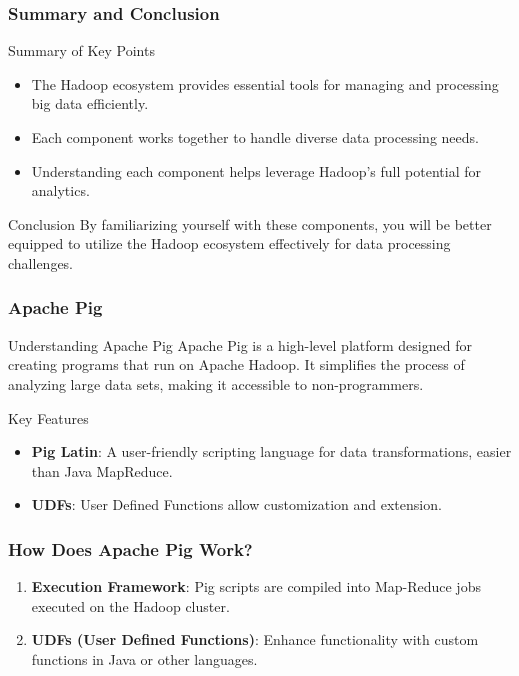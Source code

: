 \documentclass[aspectratio=169]{beamer}
\begin{document}
\begin{frame}[fragile]
    \frametitle{Summary and Conclusion}
    \begin{block}{Summary of Key Points}
        \begin{itemize}
            \item The Hadoop ecosystem provides essential tools for managing and processing big data efficiently.
            \item Each component works together to handle diverse data processing needs.
            \item Understanding each component helps leverage Hadoop’s full potential for analytics.
        \end{itemize}
    \end{block}
    
    \begin{block}{Conclusion}
        By familiarizing yourself with these components, you will be better equipped to utilize the Hadoop ecosystem effectively for data processing challenges. 
    \end{block}
\end{frame}

\begin{frame}
    \frametitle{Apache Pig}
    \begin{block}{Understanding Apache Pig}
        Apache Pig is a high-level platform designed for creating programs that run on Apache Hadoop. It simplifies the process of analyzing large data sets, making it accessible to non-programmers.
    \end{block}
    \begin{block}{Key Features}
        \begin{itemize}
            \item \textbf{Pig Latin}: A user-friendly scripting language for data transformations, easier than Java MapReduce.
            \item \textbf{UDFs}: User Defined Functions allow customization and extension.
        \end{itemize}
    \end{block}
\end{frame}

\begin{frame}[fragile]
    \frametitle{How Does Apache Pig Work?}
    \begin{enumerate}
        \item \textbf{Execution Framework}: Pig scripts are compiled into Map-Reduce jobs executed on the Hadoop cluster.
        \item \textbf{UDFs (User Defined Functions)}: Enhance functionality with custom functions in Java or other languages.
    \end{enumerate}
\end{frame}
\end{document}
